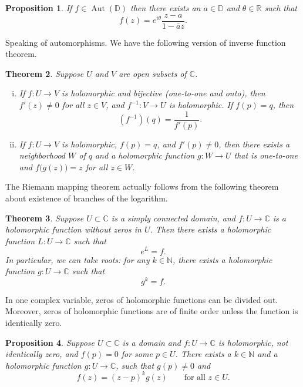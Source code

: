 \documentclass[12pt,openany]{book}
\newcommand{\C}{{\mathbb{C}}}
\newcommand{\R}{{\mathbb{R}}}
\newcommand{\N}{{\mathbb{N}}}
\newcommand{\D}{{\mathbb{D}}}
\theoremstyle{plain}
\newtheorem{thm}{Theorem}[section]
\newtheorem{prop}[thm]{Proposition}
\theoremstyle{remark}
\theoremstyle{definition}
\theoremstyle{exercise}
\theoremstyle{example}
\begin{document}
\begin{prop}
If $f \in \operatorname{Aut}(\D)$ then there exists an $a \in \D$
and $\theta \in \R$ such that
\begin{equation*}
f(z) = e^{i\theta} \frac{z-a}{1-\bar{a}z} .
\end{equation*}
\end{prop}

Speaking of automorphisms.  We have the following
version of inverse function theorem.

\begin{thm}
Suppose $U$ and $V$ are open subsets of $\C$.
\begin{enumerate}[(i)]
\item
If $f \colon U \to V$ is holomorphic and bijective (one-to-one and onto),
then $f'(z) \not= 0$ for all $z \in V$, and $f^{-1} \colon V \to U$
is holomorphic.  If $f(p) = q$, then
\begin{equation*}
\left(f^{-1}\right)(q) = \frac{1}{f'(p)} .
\end{equation*}
\item
If $f \colon U \to V$ is holomorphic, $f(p) = q$,
and $f'(p) \not= 0$, then there exists a neighborhood $W$ of $q$
and a holomorphic function $g \colon W \to U$ that is
one-to-one and $f\bigl(g(z)\bigr) = z$ for all $z \in W$.
\pagebreak[2]
\end{enumerate}
\end{thm}

The Riemann mapping theorem actually follows from the following
theorem about existence of branches of the logarithm.

\begin{thm}
Suppose $U \subset \C$ is a simply connected domain, and $f \colon U \to \C$
is a holomorphic function without zeros in $U$.  Then there exists a
holomorphic function $L \colon U \to \C$ such that
\begin{equation*}
e^L = f .
\end{equation*}
In particular, we can take roots:
for any $k \in \N$, there exists a holomorphic function
$g \colon U \to \C$ such that
\begin{equation*}
g^k = f .
\end{equation*}
\end{thm}

In one complex variable, zeros of holomorphic functions
can be divided out.  Moreover, zeros
of holomorphic functions are of finite order unless
the function is identically zero.

\begin{prop}
Suppose $U \subset \C$ is a domain and
$f \colon U \to \C$ is holomorphic, not identically zero, and $f(p) = 0$
for some $p \in U$.  There exists a $k \in \N$ and
a holomorphic function $g \colon U \to \C$,
such that $g(p) \not= 0$ and
\begin{equation*}
f(z) = {(z-p)}^k g(z) \qquad \text{for all $z \in U$.}
\end{equation*}
\end{prop}
\end{document}

